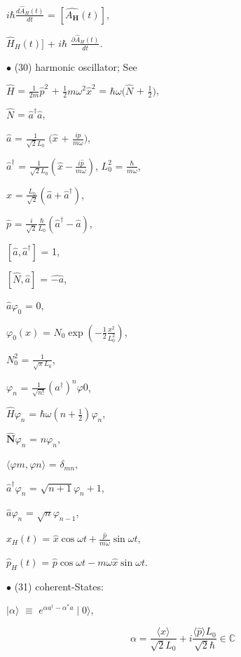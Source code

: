 \documentclass[a4paper, 10pt, onepage]{elegantbook}
\begin{document}
{$i \hbar \frac{d \hat{A}_H(t)}{dt}$ = $[\hat{A_\mathbf H}(t)]$,   

$\hat{H}_H(t)]$ + $i \hbar$ $\frac{\partial \hat{A}_H(t)}{dt}$.  

$\bullet$ (30) harmonic oscillator; See \pageref{Harmonic Oscillator}  

$\hat{H}$ = $\frac{1}{2m} \hat{p}^2$ + $\frac{1}{2}m \omega^2 \hat{x}^2$ = $ \hbar \omega(\hat{N}$ + $\frac{1}{2})$,  

$\hat{N}$ = $\hat{a}^\dagger \hat{a}$,  

$\hat{a}$ = $\frac{1}{\sqrt{2}L_0}$ $(\hat{x}$ + $\frac{i \hat{p}}{m \omega})$,  

$\hat{a}^\dagger$ = $\frac{1}{\sqrt{2}L_0}(\hat{x} - \frac{i \hat{p}}{m \omega})$, $L^2_0$ = $\frac{\hbar}{m \omega}$,  

$\hat{x}$ = $\frac{L_0}{\sqrt{2}}(\hat{a} + \hat{a}^\dagger)$,  

$\hat{p}$ = $\frac{i}{\sqrt{2}} \frac{\hbar}{L_0}(\hat{a}^\dagger - \hat{a})$,  

$[\hat{a}, \hat{a}^\dagger]$ = 1,  

$[\hat{N}, \hat{a}]$ = $\hat{-a}$,  

$\hat{a} \varphi_0$ = 0, 

$\varphi_0(x)$ = $N_0 \exp(- \frac{1}{2} \frac{x^2}{L^2_0})$, 

$N^2_0$ = $\frac{1}{\sqrt{\pi}L_0}$,  

$\varphi_n$ = $\frac{1}{\sqrt{n!}} (a^\dagger)^n \varphi0 $, 

$\hat{H} \varphi_n$ = $ \hbar \omega( n + \frac{1}{2}) \varphi_n$, 

$ \hat{\mathbf N} \varphi_n$ = $n \varphi_n$,  

$\langle \varphi{m}, \varphi{n} \rangle$ = $\delta_{mn}$, 

$\hat{a}^\dagger \varphi_n$ = $\sqrt{n + 1} \varphi_n + 1$,  

$\hat{a} \varphi_n$ = $\sqrt{n} \varphi_{n - 1}$, 

$\hat{x}_H(t)$ = $\hat{x} \cos \omega{t} + \frac{\hat{p}}{m \omega} \sin{\omega{t}}$,  

$\hat{p}_H(t)$ = $\hat{p} \cos \omega{t} - m \omega \hat{x} \sin \omega{t}$.  

$\bullet$ (31) coherent-States:

$\mid \alpha \rangle$ $\equiv$ $e^{\alpha{a}^\dagger - \alpha^*{a}} \mid 0 \rangle$,  

\begin{equation}
\alpha = \frac{\langle \hat{x} \rangle} {\sqrt2{L_0}} + i \frac{\langle \hat{p} \rangle L_0} {\sqrt2 \hbar} \in 
\mathbb{C}
\end{equation}

}
\end{document}
